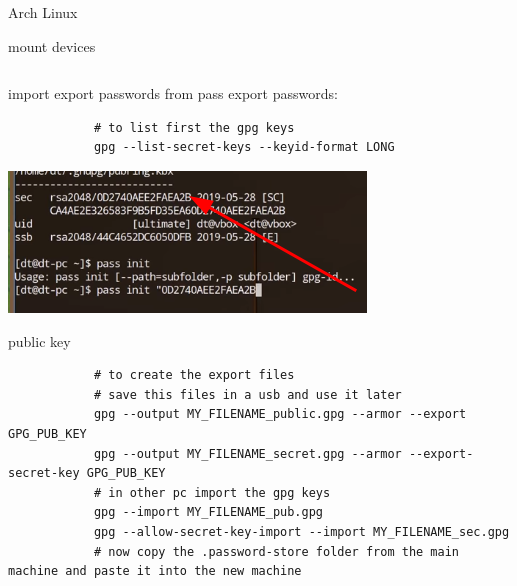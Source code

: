 \begin{section}{Arch Linux}
\begin{subsection}{mount devices}
\begin{verbatim}
		\end{verbatim}
	\end{subsection}
	\newpage
	\begin{subsection}{import export passwords from pass}
		export passwords:
		\begin{verbatim}
			# to list first the gpg keys
			gpg --list-secret-keys --keyid-format LONG
		\end{verbatim}
		\includegraphics{img_ArchLinux/publicKeyImage.png}\caption{public key}
		\begin{verbatim}
			# to create the export files
			# save this files in a usb and use it later
			gpg --output MY_FILENAME_public.gpg --armor --export GPG_PUB_KEY
			gpg --output MY_FILENAME_secret.gpg --armor --export-secret-key GPG_PUB_KEY
			# in other pc import the gpg keys
			gpg --import MY_FILENAME_pub.gpg
			gpg --allow-secret-key-import --import MY_FILENAME_sec.gpg
			# now copy the .password-store folder from the main machine and paste it into the new machine
		\end{verbatim}


	\end{subsection}

\end{section}
